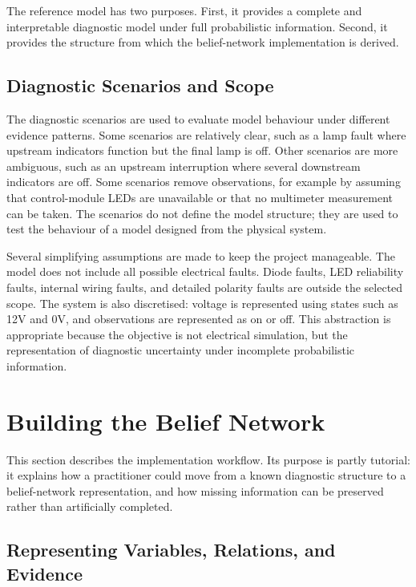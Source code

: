 \documentclass[runningheads]{llncs}
\begin{document}
The reference model has two purposes. First, it provides a complete and interpretable diagnostic model under full probabilistic information. Second, it provides the structure from which the belief-network implementation is derived.
\subsection{Diagnostic Scenarios and Scope}
\label{sec:diagnostic_scenarios_scope}

The diagnostic scenarios are used to evaluate model behaviour under different evidence patterns. Some scenarios are relatively clear, such as a lamp fault where upstream indicators function but the final lamp is off. Other scenarios are more ambiguous, such as an upstream interruption where several downstream indicators are off. Some scenarios remove observations, for example by assuming that control-module LEDs are unavailable or that no multimeter measurement can be taken. The scenarios do not define the model structure; they are used to test the behaviour of a model designed from the physical system.

Several simplifying assumptions are made to keep the project manageable. The model does not include all possible electrical faults. Diode faults, LED reliability faults, internal wiring faults, and detailed polarity faults are outside the selected scope. The system is also discretised: voltage is represented using states such as 12V and 0V, and observations are represented as on or off. This abstraction is appropriate because the objective is not electrical simulation, but the representation of diagnostic uncertainty under incomplete probabilistic information.

\section{Building the Belief Network}
\label{sec:building_belief_network}

This section describes the implementation workflow. Its purpose is partly tutorial: it explains how a practitioner could move from a known diagnostic structure to a belief-network representation, and how missing information can be preserved rather than artificially completed.

\subsection{Representing Variables, Relations, and Evidence}
\label{sec:variables_relations_evidence}
\end{document}
